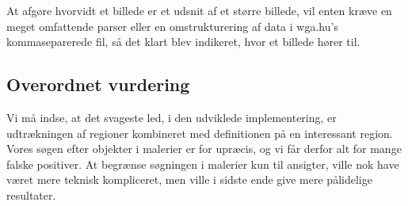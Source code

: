 {At afgøre hvorvidt et billede er et udsnit af et større billede, vil
enten kræve en meget omfattende parser eller en omstrukturering af data
i wga.hu's kommaseparerede fil, så det klart blev indikeret, hvor et
billede hører til.

\subsection{Overordnet vurdering}
Vi må indse, at det svageste led, i den udviklede implementering, er
udtrækningen af regioner kombineret med definitionen på en interessant
region. Vores søgen efter objekter i malerier er for upræcis, og vi får
derfor alt for mange falske positiver. At begrænse søgningen i malerier
kun til ansigter, ville nok have været mere teknisk kompliceret, men
ville i sidste ende give mere pålidelige resultater.

}

